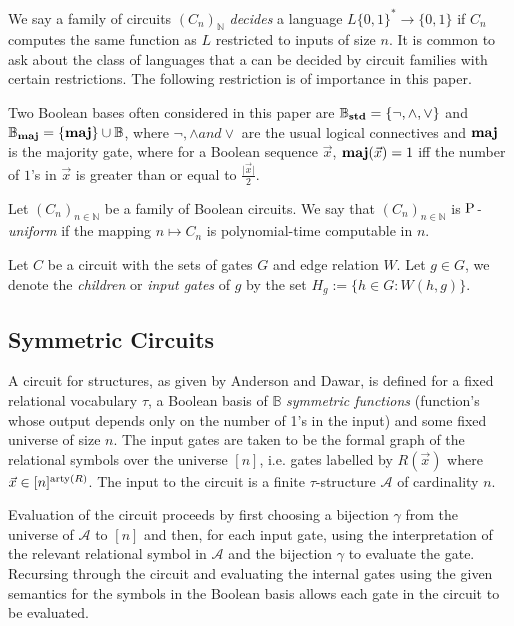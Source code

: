 \documentclass[../paper.tex]{subfiles}
\begin{document}
We say a family of circuits $(C_n)_{\mathbb{N}}$ \emph{decides} a language $L
\{0,1\}^{*} \rightarrow \{0,1\}$ if $C_n$ computes the same function as $L$
restricted to inputs of size $n$. It is common to ask about the class of
languages that a can be decided by circuit families with certain restrictions.
The following restriction is of importance in this paper.

Two Boolean bases often considered in this paper are $\mathbb{B}_{\text{\textbf{std}}} = \{
\neg , \wedge , \lor \}$ and $\mathbb{B}_{\text{\textbf{maj}}} = \{ \text{\textbf{maj}} \} \cup \mathbb{B}$,
where $\neg, \wedge and \lor$ are the usual logical connectives and $\text{\textbf{maj}}$ is
the majority gate, where for a Boolean sequence $\vec{x}$, $\text{\textbf{maj}}(\vec{x}) = 1$
iff the number of $1$'s in $\vec{x}$ is greater than or equal to
$\frac{\vert\vec{x}\vert}{2}$.


\begin{definition}
  Let $(C_n)_{n \in \mathbb{N}}$ be a family of Boolean circuits. We say that
  $(C_n)_{n \in \mathbb{N}}$ is \emph{$\mathrm{P}$-uniform} if the mapping $n \mapsto
  C_n$ is polynomial-time computable in $n$.
\end{definition}

Let $C$ be a circuit with the sets of gates $G$ and edge relation $W$. Let $g
\in G$, we denote the \emph{children} or \emph{input gates} of $g$ by the set
$H_g := \{h \in G : W(h,g)\}$.

\subsection{Symmetric Circuits}
A circuit for structures, as given by Anderson and Dawar, is defined for a fixed
relational vocabulary $\tau$, a Boolean basis of $\mathbb{B}$ \emph{symmetric
  functions} (function's whose output depends only on the number of 1's in the
input) and some fixed universe of size $n$. The input gates are taken to be the
formal graph of the relational symbols over the universe $[n]$, i.e. gates
labelled by $R(\vec{x})$ where $\vec{x} \in [n]^{\mathrm{arty}(R)}$. The input to the
circuit is a finite $\tau$-structure $\mathcal{A}$ of cardinality $n$.

Evaluation of the circuit proceeds by first choosing a bijection $\gamma$ from
the universe of $\mathcal{A}$ to $[n]$ and then, for each input gate, using the
interpretation of the relevant relational symbol in $\mathcal{A}$ and the
bijection $\gamma$ to evaluate the gate. Recursing through the circuit and
evaluating the internal gates using the given semantics for the symbols in the
Boolean basis allows each gate in the circuit to be evaluated.
\end{document}

